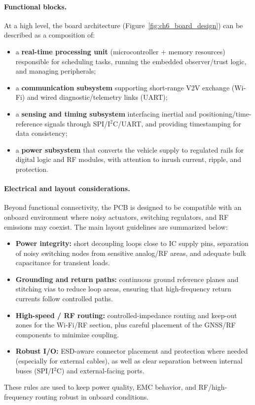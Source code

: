 \paragraph{Functional blocks.}
At a high level, the board architecture (Figure~\ref{fig:ch6_board_design}) can be described as a composition of:
\begin{itemize}
	\item a \textbf{real-time processing unit} (microcontroller + memory resources) responsible for scheduling tasks, running the embedded observer/trust logic, and managing peripherals;
	\item a \textbf{communication subsystem} supporting short-range V2V exchange (Wi-Fi) and wired diagnostic/telemetry links (UART);
	\item a \textbf{sensing and timing subsystem} interfacing inertial and positioning/time-reference signals through SPI/I$^2$C/UART, and providing timestamping for data consistency;
	\item a \textbf{power subsystem} that converts the vehicle supply to regulated rails for digital logic and RF modules, with attention to inrush current, ripple, and protection.
\end{itemize}

\paragraph{Electrical and layout considerations.}
Beyond functional connectivity, the PCB is designed to be compatible with an onboard environment where noisy actuators, switching regulators, and RF emissions may coexist.
The main layout guidelines are summarized below:
\begin{itemize}
	\item \textbf{Power integrity:} short decoupling loops close to IC supply pins, separation of noisy switching nodes from sensitive analog/RF areas, and adequate bulk capacitance for transient loads.
	\item \textbf{Grounding and return paths:} continuous ground reference planes and stitching vias to reduce loop areas, ensuring that high-frequency return currents follow controlled paths.
	\item \textbf{High-speed / RF routing:} controlled-impedance routing and keep-out zones for the Wi-Fi/RF section, plus careful placement of the GNSS/RF components to minimize coupling.
	\item \textbf{Robust I/O:} ESD-aware connector placement and protection where needed (especially for external cables), as well as clear separation between internal buses (SPI/I$^2$C) and external-facing ports.
\end{itemize}
These rules are used to keep power quality, EMC behavior, and RF/high-frequency routing robust in onboard conditions.

